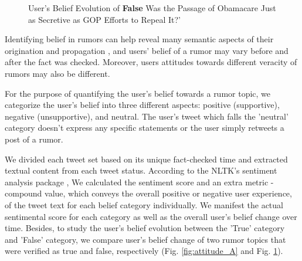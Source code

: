 \documentclass[conference]{IEEEtran}
\begin{document}
	\begin{figure}[htp]
		\centering
		\caption{User's Belief Evolution of \textbf{False} Was the Passage of Obamacare Just as Secretive as GOP Efforts to Repeal It?'}
		\label{fig:attitude_B}
	\end{figure}
	
	Identifying belief in rumors can help reveal many semantic aspects of their origination and propagation \cite{zubiaga2016analysing}, and users' belief of a rumor may vary before and after the fact was checked. Moreover, users attitudes towards different veracity of rumors may also be different. 
	
	For the purpose of quantifying the user's belief towards a rumor topic, we categorize the user's belief into three different aspects: positive (supportive), negative (unsupportive), and neutral. The user's tweet which falls the 'neutral' category doesn’t express any specific statements or the user simply retweets a post of a rumor.
	
	We divided each tweet set based on its unique fact-checked time and extracted textual content from each tweet status. According to the NLTK's sentiment analysis package \cite{bird2009natural}, We calculated the sentiment score and an extra metric - compound value, which conveys the overall positive or negative user experience, of the tweet text for each belief category individually. We manifest the actual sentimental score for each category as well as the overall user's belief change over time. Besides, to study the user's belief evolution between the 'True' category and 'False' category, we compare user's belief change of two rumor topics that were verified as true and false, respectively (Fig. \ref{fig:attitude_A} and Fig. \ref{fig:attitude_B}). 
	
\end{document}
